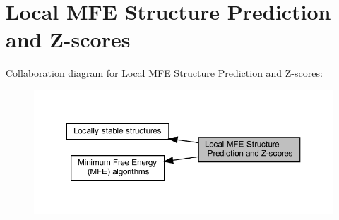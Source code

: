 \hypertarget{group__local__mfe__fold}{}\section{Local M\+FE Structure Prediction and Z-\/scores}
\label{group__local__mfe__fold}
Collaboration diagram for Local M\+FE Structure Prediction and Z-\/scores\+:
\nopagebreak
\begin{figure}[H]
\begin{center}
\leavevmode
\includegraphics[width=350pt]{group__local__mfe__fold}
\end{center}
\end{figure}

